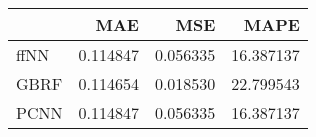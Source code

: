 \begin{tabular}{lrrr}
\toprule
{} &       MAE &       MSE &       MAPE \\
\midrule
ffNN &  0.114847 &  0.056335 &  16.387137 \\
GBRF &  0.114654 &  0.018530 &  22.799543 \\
PCNN &  0.114847 &  0.056335 &  16.387137 \\
\bottomrule
\end{tabular}

